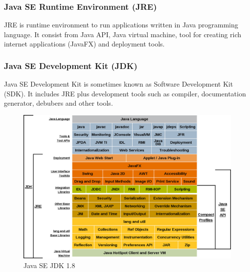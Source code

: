 \subsubsection{Java SE Runtime Environment (JRE)}
JRE is runtime environment to run applications written in Java programming language. It consist from Java API, Java virtual machine, tool for creating rich internet applications (JavaFX) and deployment tools.

\subsubsection{Java SE Development Kit (JDK)}
Java SE Development Kit is sometimes known as Software Development Kit (SDK). It includes JRE plus development tools such as compiler, documentation generator, debubers and other tools.
\\
\begin{figure}[h!]
    \centering
    \includegraphics[scale=0.35]{fig/java_jdk.jpg}
    \caption{Java SE JDK 1.8 \cite{Java8Doc}}
    \label{jdk}
\end{figure}

